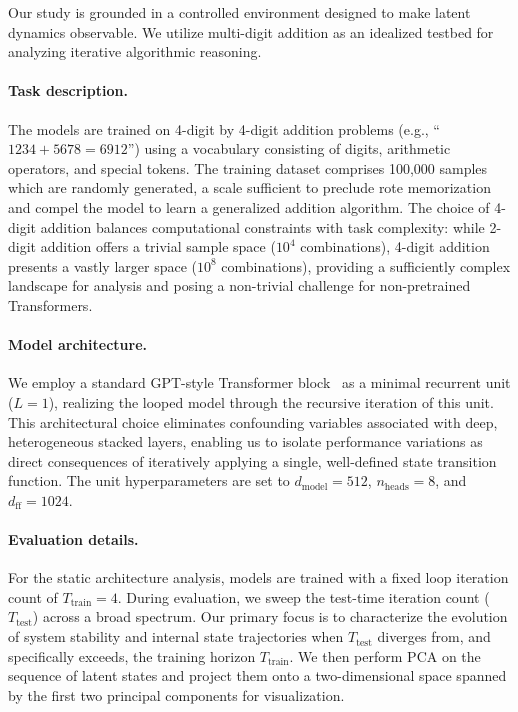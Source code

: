 Our study is grounded in a controlled environment designed to make latent dynamics observable. We utilize multi-digit addition as an idealized testbed for analyzing iterative algorithmic reasoning.

\paragraph{Task description.} The models are trained on 4-digit by 4-digit addition problems (e.g., ``$1234+5678=6912$'') using a vocabulary consisting of digits, arithmetic operators, and special tokens. The training dataset comprises 100,000 samples which are randomly generated, a scale sufficient to preclude rote memorization and compel the model to learn a generalized addition algorithm. The choice of 4-digit addition balances computational constraints with task complexity: while 2-digit addition offers a trivial sample space ($10^4$ combinations), 4-digit addition presents a vastly larger space ($10^8$ combinations), providing a sufficiently complex landscape for analysis and posing a non-trivial challenge for non-pretrained Transformers.

\paragraph{Model architecture.} We employ a standard GPT-style Transformer block~\citep{vaswani2017attention,radford2019language} as a minimal recurrent unit ($L = 1$), realizing the looped model through the recursive iteration of this unit. This architectural choice eliminates confounding variables associated with deep, heterogeneous stacked layers, enabling us to isolate performance variations as direct consequences of iteratively applying a single, well-defined state transition function. The unit hyperparameters are set to $d_{\text{model}}=512$, $n_{\text{heads}}=8$, and $d_{\text{ff}}=1024$.

\paragraph{Evaluation details.} For the static architecture analysis, models are trained with a fixed loop iteration count of $T_{\text{train}}=4$. During evaluation, we sweep the test-time iteration count ($T_{\text{test}}$) across a broad spectrum. Our primary focus is to characterize the evolution of system stability and internal state trajectories when $T_{\text{test}}$ diverges from, and specifically exceeds, the training horizon $T_{\text{train}}$. We then perform PCA on the sequence of latent states and project them onto a two-dimensional space spanned by the first two principal components for visualization.

